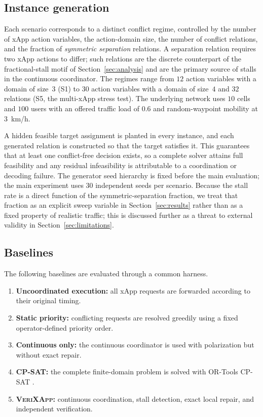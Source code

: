 \documentclass[pdflatex,sn-mathphys-num,iicol,oneside]{sn-jnl}
\newcommand{\method}{\textsc{VeriXApp}}
\begin{document}
\subsection{Instance generation}

Each scenario corresponds to a distinct conflict regime, controlled
by the number of xApp action variables, the action-domain size, the
number of conflict relations, and the fraction of \emph{symmetric
separation} relations. A separation relation requires two xApp actions
to differ; such relations are the discrete counterpart of the
fractional-stall motif of Section~\ref{sec:analysis} and are the
primary source of stalls in the continuous coordinator. The regimes
range from $12$ action variables with a domain of size~$3$ (S1) to
$30$ action variables with a domain of size~$4$ and $32$ relations
(S5, the multi-xApp stress test). The underlying network uses $10$
cells and $100$ users with an offered traffic load of $0.6$ and
random-waypoint mobility at $3$~km/h.

A hidden feasible target assignment is planted in every instance, and
each generated relation is constructed so that the target satisfies
it. This guarantees that at least one conflict-free decision exists,
so a complete solver attains full feasibility and any residual
infeasibility is attributable to a coordination or decoding failure.
The generator seed hierarchy is fixed before the main evaluation; the
main experiment uses $30$ independent seeds per scenario. Because the
stall rate is a direct function of the symmetric-separation fraction,
we treat that fraction as an explicit sweep variable in
Section~\ref{sec:results} rather than as a fixed property of realistic
traffic; this is discussed further as a threat to external validity in
Section~\ref{sec:limitations}.

\subsection{Baselines}

The following baselines are evaluated through a common harness.

\begin{enumerate}
    \item \textbf{Uncoordinated execution:} all xApp requests are
    forwarded according to their original timing.

    \item \textbf{Static priority:} conflicting requests are resolved
    greedily using a fixed operator-defined priority order.

    \item \textbf{Continuous only:} the continuous coordinator is
    used with polarization but without exact repair.

    \item \textbf{CP-SAT:} the complete finite-domain problem is
    solved with OR-Tools CP-SAT \cite{ortools}.

    \item \textbf{\method:} continuous coordination, stall detection,
    exact local repair, and independent verification.
\end{enumerate}
\end{document}
